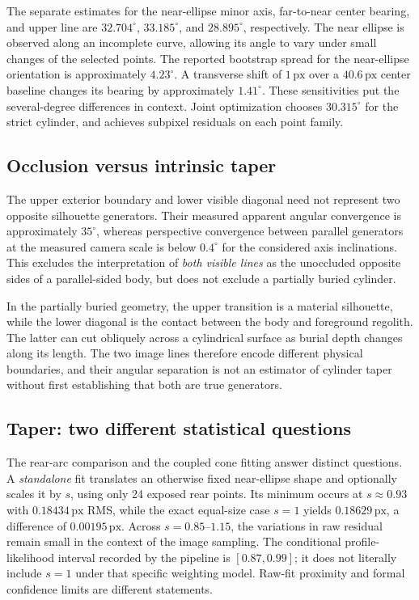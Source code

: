 \documentclass[11pt,letterpaper]{article}
\newcommand{\px}{\,\mathrm{px}}
\begin{document}
The separate estimates for the near-ellipse minor axis, far-to-near center bearing, and upper line are \(32.704^\circ\), \(33.185^\circ\), and \(28.895^\circ\), respectively. The near ellipse is observed along an incomplete curve, allowing its angle to vary under small changes of the selected points. The reported bootstrap spread for the near-ellipse orientation is approximately \(4.23^\circ\). A transverse shift of \(1\px\) over a \(40.6\px\) center baseline changes its bearing by approximately \(1.41^\circ\). These sensitivities put the several-degree differences in context. Joint optimization chooses \(30.315^\circ\) for the strict cylinder, and achieves subpixel residuals on each point family.

\subsection{Occlusion versus intrinsic taper}

The upper exterior boundary and lower visible diagonal need not represent two opposite silhouette generators. Their measured apparent angular convergence is approximately $35^\circ$, whereas perspective convergence between parallel generators at the measured camera scale is below $0.4^\circ$ for the considered axis inclinations. This excludes the interpretation of \emph{both visible lines} as the unoccluded opposite sides of a parallel-sided body, but does not exclude a partially buried cylinder.

In the partially buried geometry, the upper transition is a material silhouette, while the lower diagonal is the contact between the body and foreground regolith. The latter can cut obliquely across a cylindrical surface as burial depth changes along its length. The two image lines therefore encode different physical boundaries, and their angular separation is not an estimator of cylinder taper without first establishing that both are true generators.

\subsection{Taper: two different statistical questions}
\label{sec:taper}

The rear-arc comparison and the coupled cone fitting answer distinct questions. A \emph{standalone} fit translates an otherwise fixed near-ellipse shape and optionally scales it by \(s\), using only 24 exposed rear points. Its minimum occurs at \(s\approx0.93\) with \(0.18434\px\) RMS, while the exact equal-size case \(s=1\) yields \(0.18629\px\), a difference of \(0.00195\px\). Across \(s=0.85\)--\(1.15\), the variations in raw residual remain small in the context of the image sampling. The conditional profile-likelihood interval recorded by the pipeline is \([0.87,0.99]\); it does not literally include \(s=1\) under that specific weighting model. Raw-fit proximity and formal confidence limits are different statements.
\end{document}
